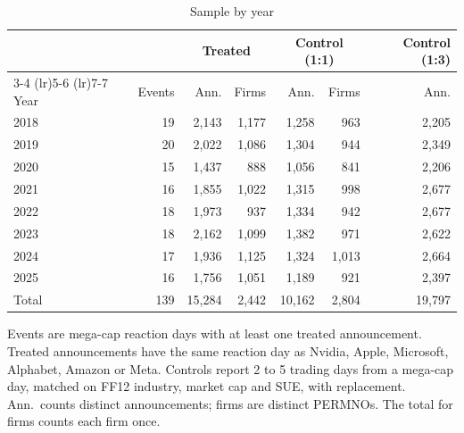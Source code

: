 \begin{table}[htbp]
\centering
\small
\caption{Sample by year}
\label{tab:sample}
\begin{tabular}{lrrrrrr}
\toprule
 & & \multicolumn{2}{c}{Treated} & \multicolumn{2}{c}{Control (1:1)} & Control (1:3) \\
\cmidrule(lr){3-4} \cmidrule(lr){5-6} \cmidrule(lr){7-7}
Year & Events & Ann. & Firms & Ann. & Firms & Ann. \\
\midrule
2018 & 19 & 2,143 & 1,177 & 1,258 & 963 & 2,205 \\
2019 & 20 & 2,022 & 1,086 & 1,304 & 944 & 2,349 \\
2020 & 15 & 1,437 & 888 & 1,056 & 841 & 2,206 \\
2021 & 16 & 1,855 & 1,022 & 1,315 & 998 & 2,677 \\
2022 & 18 & 1,973 & 937 & 1,334 & 942 & 2,677 \\
2023 & 18 & 2,162 & 1,099 & 1,382 & 971 & 2,622 \\
2024 & 17 & 1,936 & 1,125 & 1,324 & 1,013 & 2,664 \\
2025 & 16 & 1,756 & 1,051 & 1,189 & 921 & 2,397 \\
\midrule
Total & 139 & 15,284 & 2,442 & 10,162 & 2,804 & 19,797 \\
\bottomrule
\end{tabular}
\par\medskip
\parbox{0.95\linewidth}{\footnotesize Events are mega-cap reaction days with at least one treated announcement. Treated announcements have the same reaction day as Nvidia, Apple, Microsoft, Alphabet, Amazon or Meta. Controls report 2 to 5 trading days from a mega-cap day, matched on FF12 industry, market cap and SUE, with replacement. Ann.\ counts distinct announcements; firms are distinct PERMNOs. The total for firms counts each firm once.}
\end{table}

